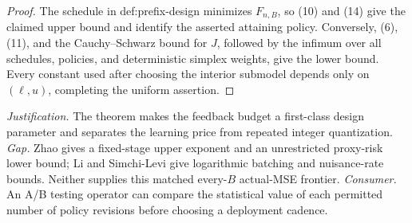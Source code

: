 \documentclass{article}
\begin{document}
\begin{proof}
The schedule in def:prefix-design minimizes \(F_{n,B}\), so (10) and (14) give the claimed upper bound and identify the asserted attaining policy.  Conversely, (6), (11), and the Cauchy--Schwarz bound for \(J\), followed by the infimum over all schedules, policies, and deterministic simplex weights, give the lower bound.  Every constant used after choosing the interior submodel depends only on \((\ell,u)\), completing the uniform assertion.
\end{proof}
\par\smallskip\noindent \textit{Justification.} The theorem makes the feedback budget a first-class design parameter and separates the learning price from repeated integer quantization. \textit{Gap.} Zhao gives a fixed-stage upper exponent and an unrestricted proxy-risk lower bound; Li and Simchi-Levi give logarithmic batching and nuisance-rate bounds. Neither supplies this matched every-\(B\) actual-MSE frontier. \textit{Consumer.} An A/B testing operator can compare the statistical value of each permitted number of policy revisions before choosing a deployment cadence.
\end{document}
